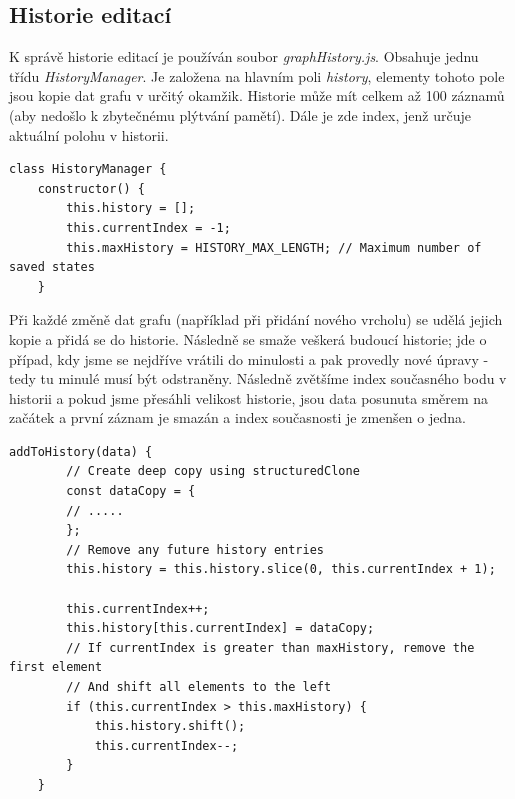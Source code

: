\subsection{Historie editací}
 K správě historie editací je používán soubor \textit{graphHistory.js}. Obsahuje jednu třídu \textit{HistoryManager}. Je založena na hlavním poli \textit{history}, elementy tohoto pole jsou kopie dat grafu v určitý okamžik. Historie může mít celkem až 100 záznamů (aby nedošlo k zbytečnému plýtvání pamětí). Dále je zde index, jenž určuje aktuální polohu v historii. 
\begin{lstlisting}[style=JavaScript, firstnumber = 4, caption={utils/graphHistory.js, proměné třídy HistoryManager},
label = {HM}]
class HistoryManager {
    constructor() {
        this.history = [];
        this.currentIndex = -1;
        this.maxHistory = HISTORY_MAX_LENGTH; // Maximum number of saved states
    }
\end{lstlisting}
Při každé změně dat grafu (například při přidání nového vrcholu) se udělá jejich kopie a přidá se do historie. Následně se smaže veškerá budoucí historie; jde o případ, kdy jsme se nejdříve vrátili do minulosti a pak provedly nové úpravy - tedy tu minulé musí být odstraněny. Následně zvětšíme index současného bodu v historii  a pokud jsme přesáhli velikost historie, jsou data posunuta směrem na začátek a první záznam je smazán a index současnosti je zmenšen o jedna.
\begin{lstlisting}[style=JavaScript, firstnumber = 13, caption={utils/graphHistory.js, přidání do historie},
label = {historyadd}]
addToHistory(data) {
        // Create deep copy using structuredClone
        const dataCopy = {
        // .....
        };
        // Remove any future history entries
        this.history = this.history.slice(0, this.currentIndex + 1);

        this.currentIndex++;
        this.history[this.currentIndex] = dataCopy;
        // If currentIndex is greater than maxHistory, remove the first element
        // And shift all elements to the left
        if (this.currentIndex > this.maxHistory) {
            this.history.shift();
            this.currentIndex--;
        }
    }
\end{lstlisting}
